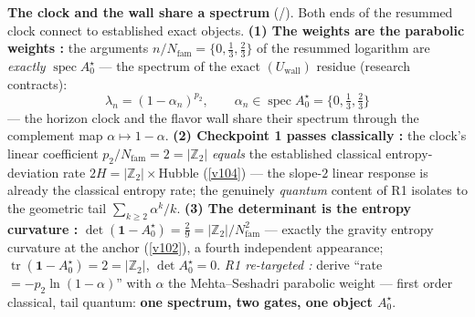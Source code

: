 \documentclass[11pt,a4paper]{article}
\newcommand{\Z}{\mathbb{Z}}
\newcommand{\Nfam}{N_{\mathrm{fam}}}
\begin{document}
\par\smallskip\noindent\textbf{The clock and the wall share a spectrum} (\mE/\mC).
Both ends of the resummed clock connect to established exact objects. \textbf{(1) The weights are the
parabolic weights \mE:} the arguments $n/\Nfam=\{0,\tfrac13,\tfrac23\}$ of the resummed logarithm are
\emph{exactly} $\operatorname{spec}A_0^\star$ --- the spectrum of the exact $(U_{\mathrm{wall}})$
residue (research contracts):
\[
  \boxed{\ \lambda_n=(1-\alpha_n)^{p_2},\qquad \alpha_n\in\operatorname{spec}A_0^\star=\{0,\tfrac13,\tfrac23\}\ }
\]
--- the horizon clock and the flavor wall share their spectrum through the complement map
$\alpha\mapsto1-\alpha$. \textbf{(2) Checkpoint 1 passes classically \mE:} the clock's linear
coefficient $p_2/\Nfam=2=|\Z_2|$ \emph{equals} the established classical entropy-deviation rate
$2H=|\Z_2|\times$Hubble (\vref{v104}) --- the slope-$2$ linear response is already the classical entropy
rate; the genuinely \emph{quantum} content of R1 isolates to the geometric tail
$\sum_{k\ge2}\alpha^k/k$. \textbf{(3) The determinant is the entropy curvature \mE:}
$\det(\mathbf1-A_0^\star)=\tfrac29=|\Z_2|/\Nfam^2$ --- exactly the gravity entropy curvature at the
anchor (\vref{v102}), a fourth independent appearance; $\operatorname{tr}(\mathbf1-A_0^\star)=2=|\Z_2|$,
$\det A_0^\star=0$. \emph{R1 re-targeted \mC:} derive ``rate $=-p_2\ln(1-\alpha)$'' with $\alpha$ the
Mehta--Seshadri parabolic weight --- first order classical, tail quantum: \textbf{one spectrum, two
gates, one object $A_0^\star$}. 
\end{document}

